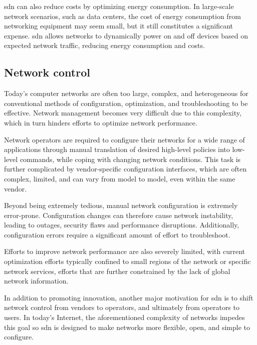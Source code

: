 \gls{sdn} can also reduce costs by optimizing energy consumption. In large-scale network scenarios, such as data centers, the cost of energy consumption from networking equipment may seem small, but it still constitutes a significant expense. \gls{sdn} allows networks to dynamically power on and off devices based on expected network traffic, reducing energy consumption and costs\cite{nunes_survey_2014}.

\subsection{Network control}
Today's computer networks are often too large, complex, and heterogeneous for conventional methods of configuration, optimization, and troubleshooting to be effective\cite{xia_survey_2015}\cite{kreutz_software-defined_2015}. Network management becomes very difficult due to this complexity, which in turn hinders efforts to optimize network performance.

Network operators are required to configure their networks for a wide range of applications through manual translation of desired high-level policies into low-level commands, while coping with changing network conditions. This task is further complicated by vendor-specific configuration interfaces, which are often complex, limited, and can vary from model to model, even within the same vendor\cite{feamster_road_2013}. 

Beyond being extremely tedious, manual network configuration is extremely error-prone. Configuration changes can therefore cause network instability, leading to outages, security flaws and performance disruptions\cite{nunes_survey_2014}. Additionally, configuration errors require a significant amount of effort to troubleshoot. 

Efforts to improve network performance are also severely limited, with current optimization efforts typically confined to small regions of the network or specific network services, efforts that are further constrained by the lack of global network information\cite{xia_survey_2015}.

In addition to promoting innovation, another major motivation for \gls{sdn} is to shift network control from vendors to operators, and ultimately from operators to users\cite{peterson_software-defined_2021}. In today's Internet, the aforementioned complexity of networks impedes this goal so \gls{sdn} is designed to make networks more flexible, open, and simple to configure.

